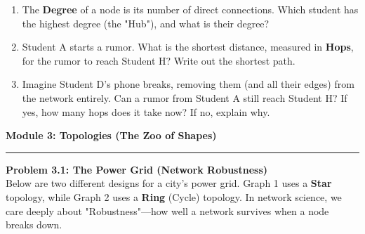 \documentclass[12pt, a4paper]{article}
\newcommand{\moduleheader}[1]{
    \vspace{1cm}
    {\Large \textcolor{riseblue}{\textbf{#1}}}
    \vspace{0.3cm}
    \hrule
    \vspace{0.5cm}
}
\begin{document}
\begin{center}
\end{center}

\begin{enumerate}
    \item The \textbf{Degree} of a node is its number of direct connections. Which student has the highest degree (the "Hub"), and what is their degree?
    \item Student A starts a rumor. What is the shortest distance, measured in \textbf{Hops}, for the rumor to reach Student H? Write out the shortest path.
    \item Imagine Student D's phone breaks, removing them (and all their edges) from the network entirely. Can a rumor from Student A still reach Student H? If yes, how many hops does it take now? If no, explain why.
\end{enumerate}

\moduleheader{Module 3: Topologies (The Zoo of Shapes)}

\textbf{Problem 3.1: The Power Grid (Network Robustness)} \\
Below are two different designs for a city's power grid. Graph 1 uses a \textbf{Star} topology, while Graph 2 uses a \textbf{Ring} (Cycle) topology. In network science, we care deeply about "Robustness"—how well a network survives when a node breaks down.
\end{document}
